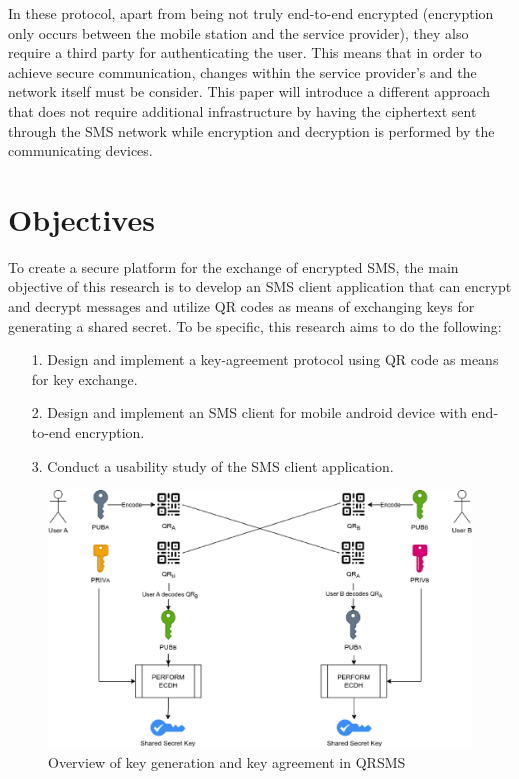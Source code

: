 \documentclass[journal]{./IEEE/IEEEtran}
\begin{document}
In these protocol, apart from being not truly end-to-end encrypted (encryption
only occurs between the mobile station and the service provider), they also
require a third party for authenticating the user. This means that in order to
achieve secure communication, changes within the service provider's and the
network itself must be consider. This paper will introduce a
different approach that does not require additional infrastructure by
having the ciphertext sent through the SMS network while encryption and
decryption is performed by the communicating devices.

\section{Objectives}
To create a secure platform for the exchange of encrypted SMS, the main
objective of this research is to develop an SMS client application that
can encrypt and decrypt messages and utilize QR codes as means of
exchanging keys for generating a shared secret. To be specific, this research
aims to do the following:
\begin{itemize}
	\item[1.] Design and implement a key-agreement protocol using QR code
		as means for key exchange.
	\item[2.] Design and implement an SMS client for mobile android device  with
		end-to-end encryption.
	\item[3.] Conduct a usability study of the SMS client application.
\end{itemize}

\begin{figure}
	\centering
	\includegraphics[width=6in]{images/key_agreement.eps}
	\caption{Overview of key generation and key agreement in QRSMS}
	\label{key_genagree}
\end{figure}
\end{document}
